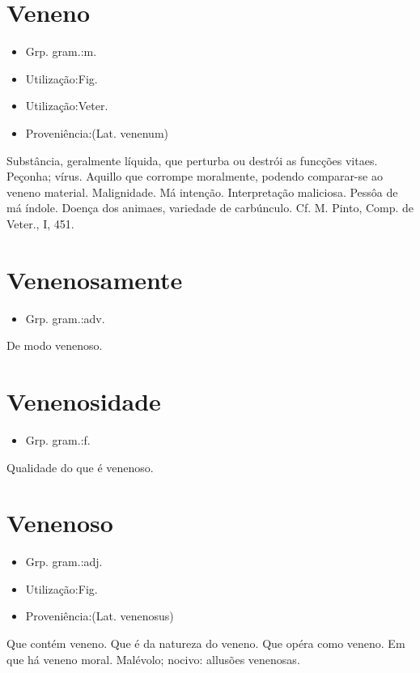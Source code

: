 \documentclass{article}
\begin{document}
\section{Veneno}
\begin{itemize}
\item {Grp. gram.:m.}
\end{itemize}
\begin{itemize}
\item {Utilização:Fig.}
\end{itemize}
\begin{itemize}
\item {Utilização:Veter.}
\end{itemize}
\begin{itemize}
\item {Proveniência:(Lat. \textunderscore venenum\textunderscore )}
\end{itemize}
Substância, geralmente líquida, que perturba ou destrói as funcções vitaes.
Peçonha; vírus.
Aquillo que corrompe moralmente, podendo comparar-se ao veneno material.
Malignidade.
Má intenção.
Interpretação maliciosa.
Pessôa de má índole.
Doença dos animaes, variedade de carbúnculo. Cf. M. Pinto, \textunderscore Comp. de Veter.\textunderscore , I, 451.
\section{Venenosamente}
\begin{itemize}
\item {Grp. gram.:adv.}
\end{itemize}
De modo venenoso.
\section{Venenosidade}
\begin{itemize}
\item {Grp. gram.:f.}
\end{itemize}
Qualidade do que é venenoso.
\section{Venenoso}
\begin{itemize}
\item {Grp. gram.:adj.}
\end{itemize}
\begin{itemize}
\item {Utilização:Fig.}
\end{itemize}
\begin{itemize}
\item {Proveniência:(Lat. \textunderscore venenosus\textunderscore )}
\end{itemize}
Que contém veneno.
Que é da natureza do veneno.
Que opéra como veneno.
Em que há veneno moral.
Malévolo; nocivo: \textunderscore allusões venenosas\textunderscore .
\end{document}
